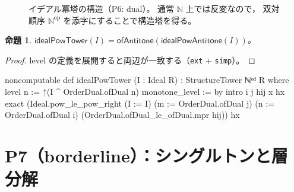 \documentclass[a4paper,11pt]{ltjsarticle}
\theoremstyle{definition}
\theoremstyle{plain}
\newtheorem{proposition}[definition]{命題}
\theoremstyle{remark}
\newcommand{\lev}{\mathrm{level}}
\newcommand{\op}{\mathrm{op}}
\begin{document}
\begin{figure}[H]
\centering
{}
\caption{イデアル冪塔の構造（P6: dual）。
  通常 $\mathbb{N}$ 上では反変なので，
  双対順序 $\mathbb{N}^{\op}$ を添字にすることで構造塔を得る。}
\label{fig:ideal-pow}
\end{figure}

\begin{proposition}
$\mathsf{idealPowTower}(I) = \mathsf{ofAntitone}(\mathsf{idealPowAntitone}(I))$。
\end{proposition}
\begin{proof}
$\lev$ の定義を展開すると両辺が一致する（\texttt{ext} + \texttt{simp}）。
\end{proof}

\begin{leancode}[caption={idealPowTower の定義（P6: dual）}]
noncomputable def idealPowTower (I : Ideal R) : StructureTower ℕᵒᵈ R where
  level n := ↑(I ^ OrderDual.ofDual n)
  monotone_level := by
    intro i j hij x hx
    exact (Ideal.pow_le_pow_right (I := I)
      (m := OrderDual.ofDual j) (n := OrderDual.ofDual i)
      (OrderDual.ofDual_le_ofDual.mpr hij)) hx
\end{leancode}

\section{P7（borderline）：シングルトンと層分解}\label{sec:singleton}
\end{document}
